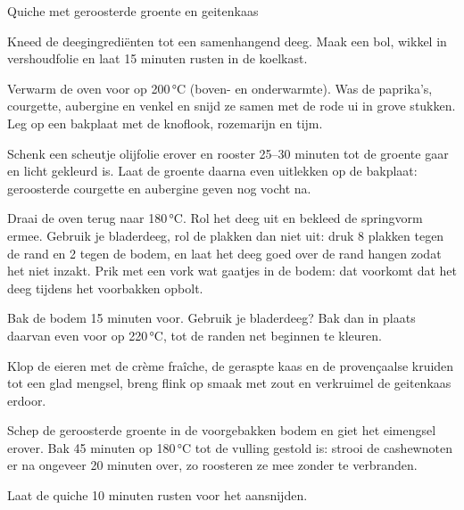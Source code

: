 \begin{recipe}{Quiche met geroosterde groente en geitenkaas}
\begin{steps}
  \item Kneed de deegingrediënten tot een samenhangend deeg. Maak een bol, wikkel
        in vershoudfolie en laat 15 minuten rusten in de koelkast.
  \item Verwarm de oven voor op 200\,°C (boven- en onderwarmte). Was de paprika's,
        courgette, aubergine en venkel en snijd ze samen met de rode ui in grove
        stukken. Leg op een bakplaat met de knoflook, rozemarijn en tijm.
  \item Schenk een scheutje olijfolie erover en rooster 25--30
        minuten tot de groente gaar en licht gekleurd is. Laat de groente
        daarna even uitlekken op de bakplaat: geroosterde courgette en
        aubergine geven nog vocht na.
  \item Draai de oven terug naar 180\,°C. Rol het deeg uit en bekleed de
        springvorm ermee. Gebruik je bladerdeeg, rol de plakken dan niet uit:
        druk 8 plakken tegen de rand en 2 tegen de bodem, en laat het deeg
        goed over de rand hangen zodat het niet inzakt. Prik met een vork wat
        gaatjes in de bodem: dat voorkomt dat het deeg tijdens het
        voorbakken opbolt.
  \item Bak de bodem 15 minuten voor. Gebruik je bladerdeeg? Bak dan in
        plaats daarvan even voor op 220\,°C, tot de randen net beginnen te
        kleuren.
  \item Klop de eieren met de crème fraîche, de geraspte kaas en de provençaalse
        kruiden tot een glad mengsel, breng flink op smaak met zout en
        verkruimel de geitenkaas erdoor.
  \item Schep de geroosterde groente in de voorgebakken bodem en giet het
        eimengsel erover. Bak 45 minuten op 180\,°C tot de vulling gestold
        is: strooi de cashewnoten er na ongeveer 20 minuten over, zo
        roosteren ze mee zonder te verbranden.
  \item Laat de quiche 10 minuten rusten voor het aansnijden.
\end{steps}

\end{recipe}
